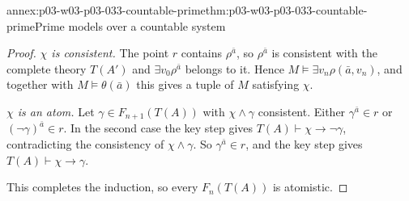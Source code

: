 \begin{annexitem}{annex:p03-w03-p03-033-countable-prime}{thm:p03-w03-p03-033-countable-prime}{Prime models over a countable system}
\begin{proof}
\emph{\(\chi\) is consistent.} The point \(r\) contains \(\rho^{\bar a}\),
so \(\rho^{\bar a}\) is consistent with the complete theory \(T(A')\) and
\(\exists v_0\rho^{\bar a}\) belongs to it. Hence
\(M\models\exists v_n\rho(\bar a,v_n)\), and together with
\(M\models\theta(\bar a)\) this gives a tuple of \(M\) satisfying \(\chi\).

\emph{\(\chi\) is an atom.} Let \(\gamma\in F_{n+1}(T(A))\) with
\(\chi\wedge\gamma\) consistent. Either \(\gamma^{\bar a}\in r\) or
\((\neg\gamma)^{\bar a}\in r\). In the second case the key step gives
\(T(A)\vdash\chi\to\neg\gamma\), contradicting the consistency of
\(\chi\wedge\gamma\). So \(\gamma^{\bar a}\in r\), and the key step gives
\(T(A)\vdash\chi\to\gamma\).

This completes the induction, so every \(F_n(T(A))\) is atomistic.
\end{proof}
\end{annexitem}

